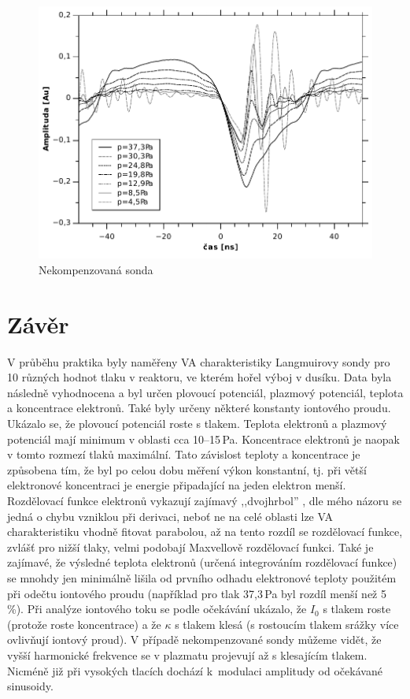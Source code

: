 \documentclass[12pt]{article}
\begin{document}
\begin{figure}[htbp]
\begin{center}
\includegraphics[width=12.8cm]{img/nekomp.pdf}
\caption{Nekompenzovaná sonda}
\label{nekomp}
\end{center}
\end{figure}


\section{Závěr}
V průběhu praktika byly naměřeny VA charakteristiky Langmuirovy sondy pro 10 různých hodnot tlaku v reaktoru, ve kterém hořel výboj v dusíku. Data byla následně vyhodnocena a byl určen plovoucí potenciál, plazmový potenciál, teplota a koncentrace elektronů. Také byly určeny některé konstanty iontového proudu. Ukázalo se, že plovoucí potenciál roste s  tlakem. Teplota elektronů a plazmový potenciál mají minimum v oblasti cca 10--15\,Pa. Koncentrace elektronů je naopak v tomto rozmezí tlaků maximální. Tato závislost teploty a koncentrace je způsobena tím, že byl po celou dobu měření výkon konstantní, tj. při větší elektronové koncentraci je energie připadající na jeden elektron menší. Rozdělovací funkce elektronů vykazují zajímavý ,,dvojhrbol'' , dle mého názoru se jedná o chybu vzniklou při derivaci, neboť ne na celé oblasti lze VA charakteristiku vhodně fitovat parabolou, až na tento rozdíl se rozdělovací funkce, zvlášť pro nižší tlaky, velmi podobají Maxvellově rozdělovací funkci. Také je zajímavé, že výsledné teplota elektronů (určená integrováním rozdělovací funkce) se mnohdy jen minimálně lišila od prvního odhadu elektronové teploty použitém při odečtu iontového proudu (například pro tlak 37,3\,Pa byl rozdíl menší než 5\,\%). Při analýze iontového toku se podle očekávání ukázalo, že $I_0$ s tlakem roste (protože roste koncentrace) a že $\kappa$ s tlakem klesá (s rostoucím tlakem srážky více ovlivňují iontový proud). V případě nekompenzované sondy můžeme vidět, že vyšší harmonické frekvence se v plazmatu projevují až s klesajícím tlakem. Nicméně již při vysokých tlacích dochází k~modulaci amplitudy od očekávané sinusoidy.
\end{document}
